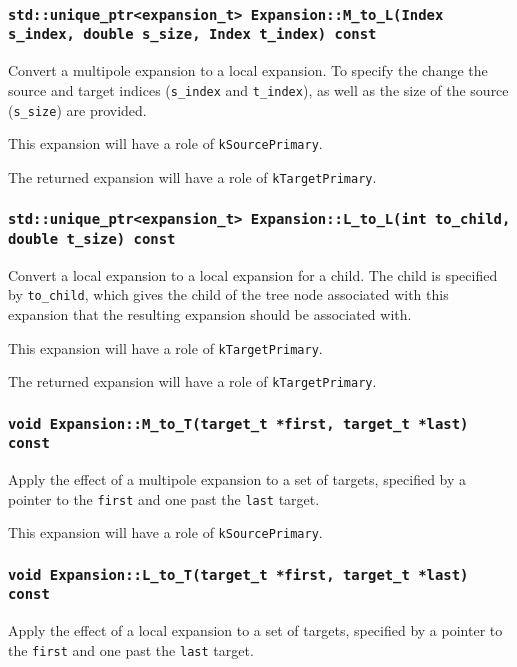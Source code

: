 \subsubsection{\texttt{std::unique\_ptr<expansion\_t> Expansion::M\_to\_L(Index s\_index, double s\_size, Index t\_index) const}}

Convert a multipole expansion to a local expansion. To specify the change the
source and target indices (\texttt{s\_index} and \texttt{t\_index}), as well
as the size of the source (\texttt{s\_size}) are provided.

This expansion will have a role of \texttt{kSourcePrimary}.

The returned expansion will have a role of \texttt{kTargetPrimary}.

\subsubsection{\texttt{std::unique\_ptr<expansion\_t> Expansion::L\_to\_L(int to\_child, double t\_size) const}}

Convert a local expansion to a local expansion for a child. The child is
specified by \texttt{to\_child}, which gives the child of the tree node
associated with this expansion that the resulting expansion should be
associated with.

This expansion will have a role of \texttt{kTargetPrimary}.

The returned expansion will have a role of \texttt{kTargetPrimary}.

\subsubsection{\texttt{void Expansion::M\_to\_T(target\_t *first, target\_t *last) const}}

Apply the effect of a multipole expansion to a set of targets, specified by
a pointer to the \texttt{first} and one past the \texttt{last} target.

This expansion will have a role of \texttt{kSourcePrimary}.

\subsubsection{\texttt{void Expansion::L\_to\_T(target\_t *first, target\_t *last) const}}

Apply the effect of a local expansion to a set of targets, specified by
a pointer to the \texttt{first} and one past the \texttt{last} target.

